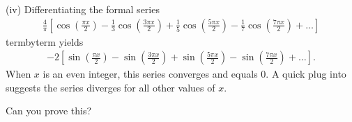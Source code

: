 \documentclass[letterpaper,10pt,english]{jupyterBook}
\begin{document}
\sphinxAtStartPar
(iv) Differentiating the formal series
\begin{equation*}
\begin{split}
\frac{4}{\pi}\left[\cos\left(\frac{\pi x}{2}\right)-\frac{1}{3}\cos\left(\frac{3\pi x}{2}\right)+\frac{1}{5}\cos\left(\frac{5\pi x}{2}\right)-\frac{1}{7}\cos\left(\frac{7\pi x}{2}\right)+\ldots\right]
\end{split}
\end{equation*}
\sphinxAtStartPar
term\sphinxhyphen{}by\sphinxhyphen{}term yields
\begin{equation*}
\begin{split}
-2\left[\sin\left(\frac{\pi x}{2}\right)-\sin\left(\frac{3\pi x}{2}\right)+\sin\left(\frac{5\pi x}{2}\right)-\sin\left(\frac{7\pi x}{2}\right)+\ldots\right].
\end{split}
\end{equation*}
\sphinxAtStartPar
When \(x\) is an even integer, this series converges and equals \(0\). A quick plug into  suggests the series diverges for all other values of \(x\).

\sphinxAtStartPar
{} Can you prove this?
\end{document}
